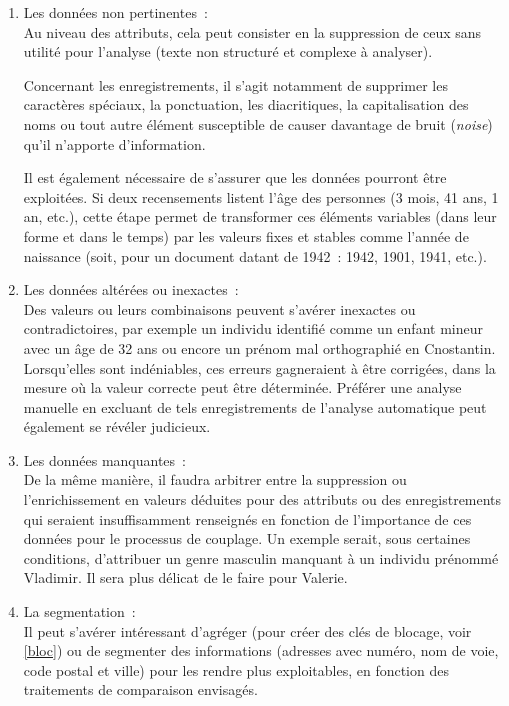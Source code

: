 \documentclass[a4paper,12pt,twoside]{book}
\begin{document}
			    \begin{enumerate}
			        \item Les données non pertinentes~:\\
			        Au niveau des attributs, cela peut consister en la suppression de ceux sans utilité pour l'analyse (texte non structuré et complexe à analyser).
			        
			        Concernant les enregistrements, il s'agit notamment de supprimer les caractères spéciaux, la ponctuation, les diacritiques, la capitalisation des noms ou tout autre élément susceptible de causer davantage de bruit (\textit{noise}) qu'il n'apporte d'information. 
			        
			        Il est également nécessaire de s'assurer que les données pourront être exploitées. Si deux recensements listent l'âge des personnes (3 mois, 41 ans, 1 an, etc.), cette étape permet de transformer ces éléments variables (dans leur forme et dans le temps) par les valeurs fixes et stables comme l'année de naissance (soit, pour un document datant de 1942~: 1942, 1901, 1941, etc.).

			        \item Les données altérées ou inexactes~:\\
			        Des valeurs ou leurs combinaisons peuvent s'avérer inexactes ou contradictoires, par exemple un individu identifié comme un enfant mineur avec un âge de 32 ans ou encore un prénom mal orthographié en \og{}Cnostantin\fg{}. Lorsqu'elles sont indéniables, ces erreurs gagneraient à être corrigées, dans la mesure où la valeur correcte peut être déterminée. Préférer une analyse manuelle en excluant de tels enregistrements de l'analyse automatique peut également se révéler judicieux.
			        
			        \item Les données manquantes~:\\
			        De la même manière, il faudra arbitrer entre la suppression ou l'enrichissement en valeurs déduites pour des attributs ou des enregistrements qui seraient insuffisamment renseignés en fonction de l'importance de ces données pour le processus de couplage. Un exemple serait, sous certaines conditions, d'attribuer un genre masculin manquant à un individu prénommé \og{}Vladimir\fg{}. Il sera plus délicat de le faire pour \og{}Valerie\fg{}.
			        
			        \item La segmentation~:\\
			        Il peut s'avérer intéressant d'agréger (pour créer des clés de blocage, voir \ref{bloc}) ou de segmenter des informations (adresses avec numéro, nom de voie, code postal et ville) pour les rendre plus exploitables, en fonction des traitements de comparaison envisagés.
			        

\end{enumerate}
\end{document}
